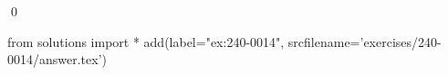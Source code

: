 
\begin{ex} 
  \label{ex:240-0014}
  
  \qed
\end{ex} 
\begin{python0}
from solutions import *
add(label="ex:240-0014",
    srcfilename='exercises/240-0014/answer.tex') 
\end{python0}
